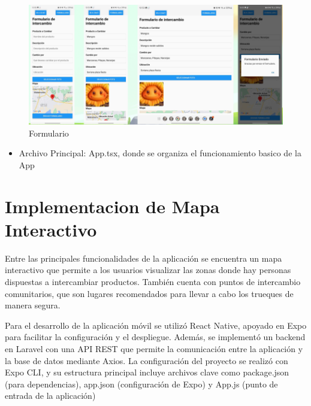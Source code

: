 \documentclass[11pt, a4paper, oneside]{book}
\begin{document}
\begin{figure}[H]
\centering
\includegraphics[width=1\textwidth]{Pictures/trueque.png}
\caption{Formulario}
\end{figure}

\begin{itemize}
    \item Archivo Principal: App.tsx, donde se organiza el funcionamiento basico de la App 
\end{itemize}


\chapter{Implementacion de Mapa Interactivo }

Entre las principales funcionalidades de la aplicación se encuentra un mapa interactivo que permite a los usuarios visualizar las zonas donde hay personas dispuestas a intercambiar productos. También cuenta con puntos de intercambio comunitarios, que son lugares recomendados para llevar a cabo los trueques de manera segura.


Para el desarrollo de la aplicación móvil se utilizó React Native, apoyado en Expo para facilitar la configuración y el despliegue. Además, se implementó un backend en Laravel con una API REST que permite la comunicación entre la aplicación y la base de datos mediante Axios. La configuración del proyecto se realizó con Expo CLI, y su estructura principal incluye archivos clave como package.json (para dependencias), app.json (configuración de Expo) y App.js (punto de entrada de la aplicación)
\end{document}
